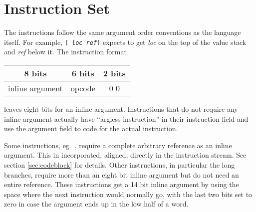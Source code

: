 \section{Instruction Set}
The instructions follow the same argument order conventions as the
language itself.  For example, \texttt{( \emph{loc ref})}
expects to get \emph{loc} on the top of the value stack and \emph{ref}
below it.  The instruction format
\begin{center} \begin{tabular}{|c|c|c|}\hline
 8 bits          & 6 bits & 2 bits \\\hline
 inline argument & opcode & 0 0    \\\hline
\end{tabular} \end{center}
leaves eight bits for an inline argument.  Instructions that do not
require any inline argument actually have ``argless instruction'' in
their instruction field and use the argument field to code for the
actual instruction.

Some instructions, eg.\ , require a complete arbitrary
reference as an inline argument.  This in incorporated, aligned,
directly in the instruction stream.  See section \ref{sec:codeblock}
for details.  Other instructions, in particular the long branches,
require more than an eight bit inline argument but do not need an
entire reference.  These instructions get a 14 bit inline argument by
using the space where the next instruction would normally go, with the
last two bits set to zero in case the argument ends up in the low half
of a word.

\newenvironment{itable}[1]{
\begin{center} \par \nopagebreak #1 \par \nopagebreak
\begin{tabular}{|l|c|l|l|l|} \hline
\emph{instruction} & \emph{inline arg} & \emph{initial stack}
 & \emph{final stack} & \emph{extra cell args}
\\\hline\hline}{\hline\end{tabular}\end{center}}

\newcommand{\icomment}[1]{\multicolumn{5}{|l|}{\parbox{4in}{#1}}\\\hline}

